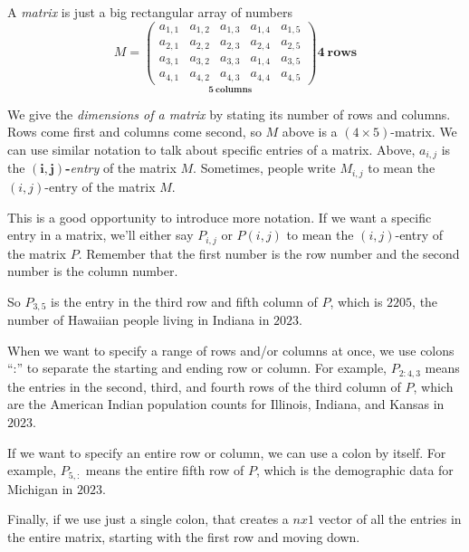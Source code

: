 \documentclass{ximera}
\begin{document}
\begin{definition}\label{def:matrixbasic}

    A \emph{matrix} is just a big rectangular array of numbers
    \[
    M =
    \underset{\displaystyle\boldsymbol{5}~\textbf{columns}}{\begin{pmatrix}
      a_{1,1} & a_{1,2} & a_{1,3} & a_{1,4} & a_{1,5} \\
      a_{2,1} & a_{2,2} & a_{2,3} & a_{2,4} & a_{2,5} \\
      a_{3,1} & a_{3,2} & a_{3,3} & a_{1,4} & a_{3,5} \\
      a_{4,1} & a_{4,2} & a_{4,3} & a_{4,4} & a_{4,5}
    \end{pmatrix}}
    \boldsymbol{4}~\textbf {rows}
    \]
    
    We give the \emph{dimensions of a matrix} by stating its number of rows
    and columns. Rows come first and columns come second, so $M$ above is
    a $(4\times 5)$-matrix. We can use similar notation to talk about
    specific entries of a matrix. Above, $a_{i,j}$ is the
    $\boldsymbol{(i,j)}${\bf-}\emph{entry} of the matrix $M$. Sometimes,
    people write $M_{i,j}$ to mean the $(i,j)$-entry of the matrix $M$.
    
\end{definition}

\begin{definition}

    This is a good opportunity to introduce more notation. If we want a specific entry in a matrix, we'll either say $P_{i,j}$ or $P(i,j)$ to mean the $(i,j)$-entry of the matrix $P$. Remember that the first number is the row number and the second number is the column number.

    So $P_{3,5}$ is the entry in the third row and fifth column of $P$, which is $2205$, the number of Hawaiian people living in Indiana in $2023$.

    When we want to specify a range of rows and/or columns at once, we use colons ``:'' to separate the starting and ending row or column. For example, $P_{2:4,3}$ means the entries in the second, third, and fourth rows of the third column of $P$, which are the American Indian population counts for Illinois, Indiana, and Kansas in $2023$.

    If we want to specify an entire row or column, we can use a colon by itself. For example, $P_{5,:}$ means the entire fifth row of $P$, which is the demographic data for Michigan in $2023$. 

    Finally, if we use just a single colon, that creates a $nx1$ vector of all the entries in the entire matrix, starting with the first row and moving down. 

  \end{definition}
\end{document}

